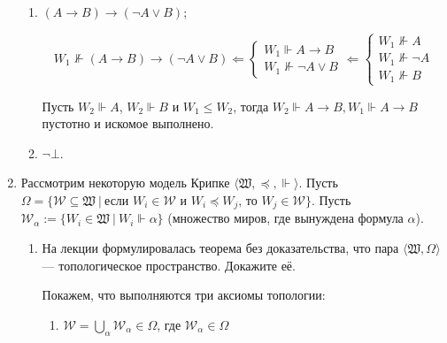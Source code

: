 \begin{enumerate}[wide, labelwidth=!, labelindent=0pt]
\begin{enumerate}[wide, labelwidth=!, labelindent=0pt]
                  \item $(A \rightarrow B) \rightarrow (\neg A \vee B)$;

                        \[W_1 \nVdash (A \rightarrow B) \rightarrow (\neg A \vee B) \Leftarrow \begin{cases}
                                    W_1 \Vdash A \to B \\
                                    W_1 \nVdash \neg A \lor B
                              \end{cases} \Leftarrow \begin{cases}
                                    W_1 \nVdash A      \\
                                    W_1 \nVdash \neg A \\
                                    W_1 \nVdash B
                              \end{cases}\]

                        Пусть \(W_2 \Vdash A\), \(W_2 \Vdash B\) и \(W_1 \leq W_2\), тогда \(W_2 \Vdash A \to B, W_1 \Vdash A \to B\) пустотно и искомое выполнено.

                  \item $\neg\bot$.

                        \begin{prooftree}
                        \end{prooftree}
            \end{enumerate}

      \item Рассмотрим некоторую модель Крипке $\langle\mathfrak{W},\preceq,\Vdash\rangle$.
            Пусть $\Omega = \{ \mathcal{W} \subseteq \mathfrak{W}\ |\ \text{если }W_i \in \mathcal{W}\text{ и }W_i \preceq W_j\text{, то } W_j \in \mathcal{W}\}$.
            Пусть $\mathcal{W}_\alpha := \{ W_i \in \mathfrak{W}\ |\ W_i \Vdash \alpha \}$ (множество миров, где вынуждена формула $\alpha$).
            \begin{enumerate}
                  \item На лекции формулировалась теорема без доказательства, что пара $\langle\mathfrak{W}, \Omega\rangle$ --- топологическое пространство. Докажите её.

                        Покажем, что выполняются три аксиомы топологии:
                        \begin{enumerate}
                              \item \(\mathcal{W} = \bigcup_\alpha \mathcal{W}_\alpha \in \Omega\), где \(\mathcal{W}_\alpha\in\Omega\)


\end{enumerate}
\end{enumerate}
\end{enumerate}
